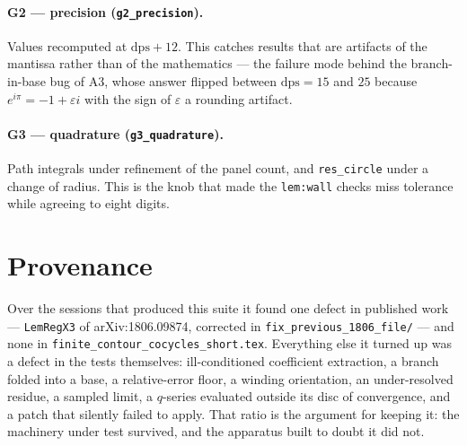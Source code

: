 \documentclass[11pt]{article}
\newcommand{\code}[1]{\texttt{#1}}
\begin{document}
\paragraph{G2 --- precision (\code{g2\_precision}).}
Values recomputed at $\mathrm{dps}+12$. This catches results that are artifacts of the mantissa
rather than of the mathematics --- the failure mode behind the branch-in-base bug of A3, whose
answer flipped between $\mathrm{dps}=15$ and $25$ because $e^{i\pi}=-1+\varepsilon i$ with the
sign of $\varepsilon$ a rounding artifact.

\paragraph{G3 --- quadrature (\code{g3\_quadrature}).}
Path integrals under refinement of the panel count, and \code{res\_circle} under a change of
radius. This is the knob that made the \code{lem:wall} checks miss tolerance while agreeing to
eight digits.

\section*{Provenance}

Over the sessions that produced this suite it found one defect in published work ---
\code{LemRegX3} of arXiv:1806.09874, corrected in \code{fix\_previous\_1806\_file/} --- and none
in \code{finite\_contour\_cocycles\_short.tex}. Everything else it turned up was a defect in the
tests themselves: ill-conditioned coefficient extraction, a branch folded into a base, a
relative-error floor, a winding orientation, an under-resolved residue, a sampled limit, a
$q$-series evaluated outside its disc of convergence, and a patch that silently failed to
apply. That ratio is the argument for keeping it: the machinery under test survived, and the
apparatus built to doubt it did not.
\end{document}
